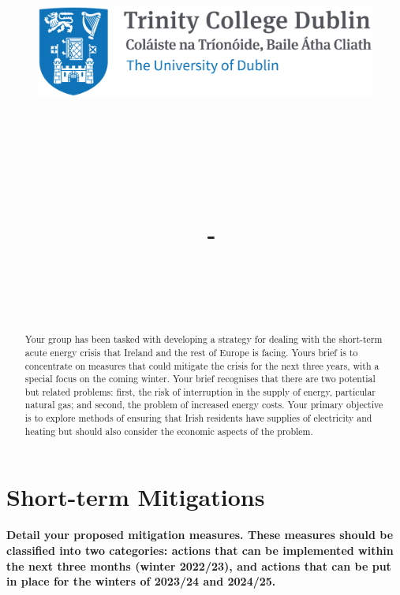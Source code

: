 \documentclass{article}
\title{
    \vspace{-1in}
    \begin{figure}[!ht]
    \flushleft
    \includegraphics[width=0.4\linewidth]{reduced-trinity.png}
    \end{figure}
    \vspace{-0.5cm}
    \hrulefill \\
    \vspace{1cm}
    \textmd{\textbf{\moduleCode\ \moduleName}}\\
    \textmd{\textbf{\assignmentTitle}}\\
    \textmd{\authorName\ - \authorID}\\
    \textmd{\reportDate}\\
    \vspace{0.5cm}
    \hrulefill \\
}
\date{}
\author{}
\begin{document}
    \lstset{language=bash, float=h, captionpos=b, frame=single, numbers=left, numberblanklines=false, numberstyle=\tiny, numbersep=1mm, framexleftmargin=3mm, xleftmargin=5mm, aboveskip=3mm, breaklines=true}
    \captionsetup{width=.8\linewidth} 

    \maketitle
    \begin{abstract}
        Your group has been tasked with developing a strategy for dealing with the short-term acute energy crisis that Ireland and the rest of Europe is facing. Yours brief is to concentrate on measures that could mitigate the crisis for the next three years, with a special focus on the coming winter. Your brief recognises that there are two potential but related problems: first, the risk of interruption in the supply of energy, particular natural gas; and second, the problem of increased energy costs. Your primary objective is to explore methods of ensuring that Irish residents have supplies of electricity and heating but should also consider the economic aspects of the problem. 
    \end{abstract}
    \tableofcontents
    \newpage

    \section{Short-term Mitigations}
    {\scriptsize\textbf{Detail your proposed mitigation measures. These measures should be classified into two categories: actions that can be implemented within the next three months (winter 2022/23), and actions that can be put in place for the winters of 2023/24 and 2024/25.}}
    \vspace{10pt}
\end{document}
